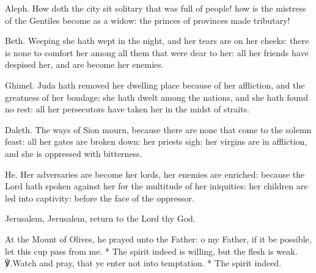 \documentclass[12pt]{book}
\begin{document}


{}

\newpage
\altlarge
{}
\altitshape

\begin{enpars}
Aleph. How doth the city sit solitary that was full of people! how is the mistress of the Gentiles become as a widow: the princes of provinces made tributary!

Beth. Weeping she hath wept in the night, and her tears are on her cheeks: there is none to comfort her among all them that were dear to her: all her friends have despised her, and are become her enemies.

Ghimel. Juda hath removed her dwelling place because of her affliction, and the greatness of her bondage: she hath dwelt among the nations, and she hath found no rest: all her persecutors have taken her in the midst of straits.

Daleth. The ways of Sion mourn, because there are none that come to the solemn feast: all her gates are broken down: her priests sigh: her virgins are in affliction, and she is oppressed with bitterness.

He. Her adversaries are become her lords, her enemies are enriched: because the Lord hath spoken against her for the multitude of her iniquities: her children are led into captivity: before the face of the oppressor.

Jerusalem, Jerusalem, return to the Lord thy God.
\end{enpars}


\begin{enpars}
At the Mount of Olives, he prayed unto the Father: o my Father, if it be possible, let this cup pass from me. * The spirit indeed is willing, but the flesh is weak.
℣.\@ Watch and pray, that ye enter not into temptation.
* The spirit indeed.
\end{enpars}
\end{document}
